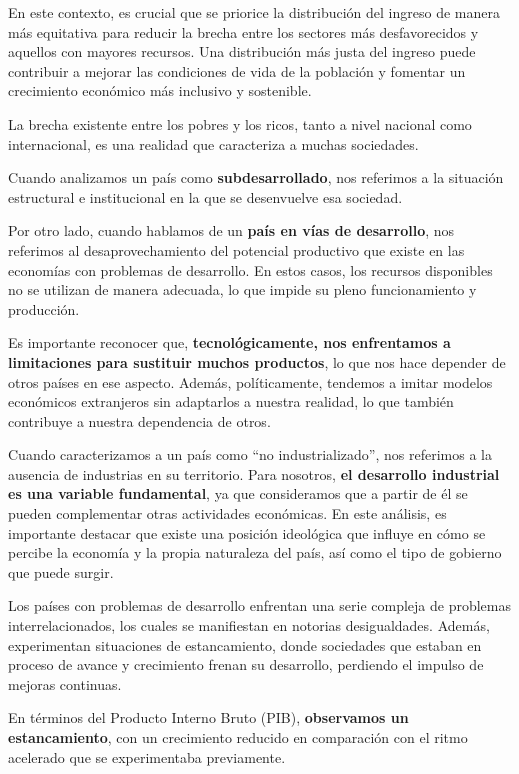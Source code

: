 \documentclass[
  a4paper,
]{article}
\begin{document}
En este contexto, es crucial que se priorice la distribución del ingreso
de manera más equitativa para reducir la brecha entre los sectores más
desfavorecidos y aquellos con mayores recursos. Una distribución más
justa del ingreso puede contribuir a mejorar las condiciones de vida de
la población y fomentar un crecimiento económico más inclusivo y
sostenible.

La brecha existente entre los pobres y los ricos, tanto a nivel nacional
como internacional, es una realidad que caracteriza a muchas sociedades.

Cuando analizamos un país como \textbf{subdesarrollado}, nos referimos a
la situación estructural e institucional en la que se desenvuelve esa
sociedad.

Por otro lado, cuando hablamos de un \textbf{país en vías de
desarrollo}, nos referimos al desaprovechamiento del potencial
productivo que existe en las economías con problemas de desarrollo. En
estos casos, los recursos disponibles no se utilizan de manera adecuada,
lo que impide su pleno funcionamiento y producción.

Es importante reconocer que, \textbf{tecnológicamente, nos enfrentamos a
limitaciones para sustituir muchos productos}, lo que nos hace depender
de otros países en ese aspecto. Además, políticamente, tendemos a imitar
modelos económicos extranjeros sin adaptarlos a nuestra realidad, lo que
también contribuye a nuestra dependencia de otros.

Cuando caracterizamos a un país como ``no industrializado'', nos
referimos a la ausencia de industrias en su territorio. Para nosotros,
\textbf{el desarrollo industrial es una variable fundamental}, ya que
consideramos que a partir de él se pueden complementar otras actividades
económicas. En este análisis, es importante destacar que existe una
posición ideológica que influye en cómo se percibe la economía y la
propia naturaleza del país, así como el tipo de gobierno que puede
surgir.

Los países con problemas de desarrollo enfrentan una serie compleja de
problemas interrelacionados, los cuales se manifiestan en notorias
desigualdades. Además, experimentan situaciones de estancamiento, donde
sociedades que estaban en proceso de avance y crecimiento frenan su
desarrollo, perdiendo el impulso de mejoras continuas.

En términos del Producto Interno Bruto (PIB), \textbf{observamos un
estancamiento}, con un crecimiento reducido en comparación con el ritmo
acelerado que se experimentaba previamente.
\end{document}
